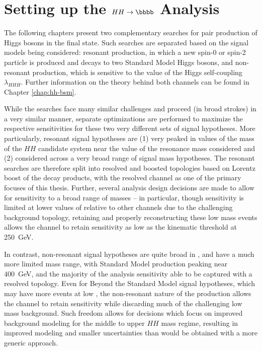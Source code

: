 \chapter{Setting up the $HH\rightarrow \bbbb$ Analysis}
\label{chap:bbbb-intro}

The following chapters present two complementary searches for pair production of 
Higgs bosons in the final state. Such searches are separated based on the 
signal models being considered: resonant production, in which a new spin-0 or 
spin-2 particle is produced and decays to two Standard Model Higgs bosons, and 
non-resonant production, which is sensitive to the value of the Higgs self-coupling
$\lambda_{HHH}$. Further information on the theory behind both channels can be 
found in Chapter \ref{chap:hh-bsm}.

While the searches face many similar challenges and proceed (in broad strokes) in a very 
similar manner, separate optimizations are performed to maximize the respective sensitivities 
for these two very different sets of signal hypotheses. More particularly, resonant signal 
hypotheses are (1) very peaked in values of the mass of the $HH$ candidate system near the 
value of the resonance mass considered and (2) considered across a very broad range of 
signal mass hypotheses. The resonant searches are therefore split into resolved and boosted 
topologies based on Lorentz boost of the decay products, with the resolved channel as one of the 
primary focuses of this thesis. Further, several analysis design decisions are made to 
allow for sensitivity to a broad range of masses -- in particular, though sensitivity is 
limited at lower values of \mhh relative to other channels  due to 
the challenging background topology, retaining and properly reconstructing these low mass events 
allows the \bbbb channel to retain sensitivity as low as the kinematic threshold at \SI{250}{\GeV}.

In contrast, non-resonant signal hypotheses are quite broad in \mhh, and have a much more limited 
mass range, with Standard Model production peaking near \SI{400}{GeV}, and the majority of the analysis 
sensitivity able to be captured with a resolved topology. Even for Beyond the Standard 
Model signal hypotheses, which may have more events at low \mhh, the non-resonant nature of the
production allows the \bbbb channel to retain sensitivity while discarding much of the challenging 
low mass background. Such freedom allows for decisions which focus on improved background modeling 
for the middle to upper $HH$ mass regime, resulting in improved modeling and smaller uncertainties 
than would be obtained with a more generic approach.

